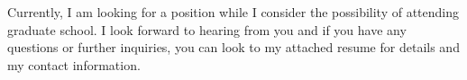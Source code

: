 \documentclass[11pt,a4paper,sans]{moderncv} %
\begin{document}
\hspace{1cm} Currently, I am looking for a position while I consider the possibility of attending graduate school. I look forward to hearing from you and if you have any questions or further inquiries, you can look to my attached resume for details and my contact information.

\makeletterclosing %

\end{document}
